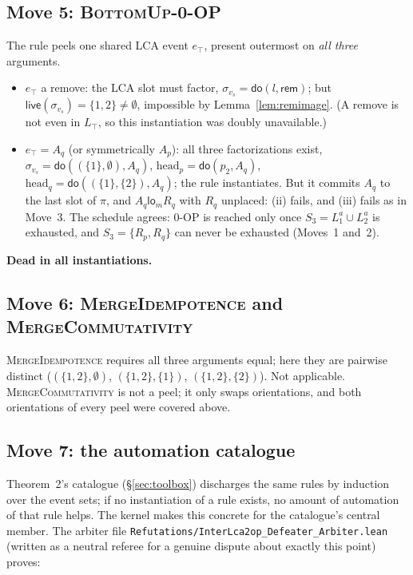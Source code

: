 \documentclass[11pt]{article}
\newcommand{\rem}{\mathsf{rem}}
\newcommand{\lom}{\mathsf{lo}_m}
\newcommand{\lean}[1]{\texttt{#1}}
\newcommand{\live}{\mathsf{live}}
\newcommand{\Ap}{A_p}
\newcommand{\Aq}{A_q}
\newcommand{\Rp}{R_p}
\newcommand{\Rq}{R_q}
\begin{document}
\subsection{Move 5: \textsc{BottomUp-0-OP}}

The rule peels one shared LCA event $e_\top$, present outermost on
\emph{all three} arguments.
\begin{itemize}[leftmargin=2em]
\item $e_\top$ a remove: the LCA slot must factor,
  $\sigma_{v_s} = \mathsf{do}(l, \rem)$; but
  $\live(\sigma_{v_s}) = \{1,2\} \neq \emptyset$, impossible by
  Lemma~\ref{lem:remimage}. (A remove is not even in $L_\top$, so this
  instantiation was doubly unavailable.)
\item $e_\top = \Aq$ (or symmetrically $\Ap$): all three
  factorizations exist,
  $\sigma_{v_s} = \mathsf{do}((\{1\},\emptyset), \Aq)$,
  $\mathrm{head}_p = \mathsf{do}(p_2, \Aq)$,
  $\mathrm{head}_q = \mathsf{do}((\{1\},\{2\}), \Aq)$; the rule
  instantiates. But it commits $\Aq$ to the last slot of $\pi$, and
  $\Aq \mathrel{\lom} \Rq$ with $\Rq$ unplaced: (ii) fails, and (iii)
  fails as in Move~3. The schedule agrees: \textsc{0-OP} is reached
  only once $S_3 = L_1^a \cup L_2^a$ is exhausted, and
  $S_3 = \{\Rp, \Rq\}$ can never be exhausted (Moves~1 and~2).
\end{itemize}
\textbf{Dead in all instantiations.}

\subsection{Move 6: \textsc{MergeIdempotence} and
\textsc{MergeCommutativity}}

\textsc{MergeIdempotence} requires all three arguments equal; here
they are pairwise distinct ($(\{1,2\},\emptyset)$,
$(\{1,2\},\{1\})$, $(\{1,2\},\{2\})$). Not applicable.
\textsc{MergeCommutativity} is not a peel; it only swaps orientations,
and both orientations of every peel were covered above.

\subsection{Move 7: the automation catalogue}
\label{sec:move7}

Theorem~2's catalogue (\S\ref{sec:toolbox}) discharges the same rules
by induction over the event sets; if no instantiation of a rule exists,
no amount of automation of that rule helps. The kernel makes this
concrete for the catalogue's central member. The arbiter file
\lean{Refutations/InterLca2op\_Defeater\_Arbiter.lean} (written as a
neutral referee for a genuine dispute about exactly this point) proves:
\end{document}
